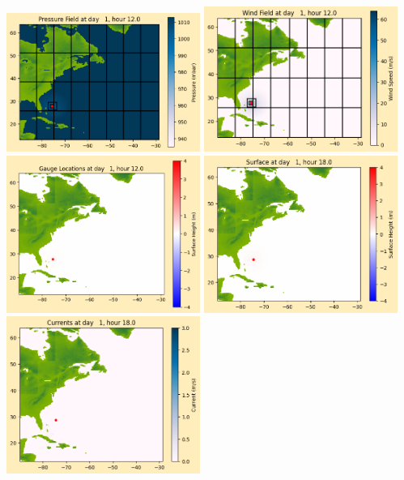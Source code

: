 \documentclass[11pt]{article}
\begin{document}
\includegraphics[width=0.475\textwidth]{frame0018fig1012.png}
\vskip 10pt 
\includegraphics[width=0.475\textwidth]{frame0018fig1013.png}
\includegraphics[width=0.475\textwidth]{frame0018fig1014.png}
\vskip 10pt 
\includegraphics[width=0.475\textwidth]{frame0019fig1001.png}
\includegraphics[width=0.475\textwidth]{frame0019fig1002.png}
\end{document}
